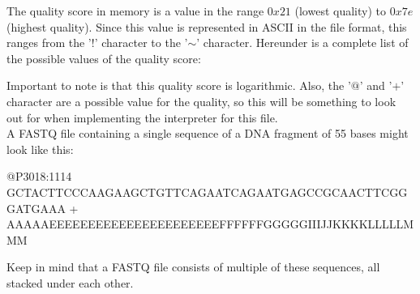 The quality score in memory is a value in the range $0x21$ (lowest quality) to $0x7e$ (highest quality). Since this value is represented in ASCII in the file format, this ranges from the '$!$' character to the '$\mathtt{\sim}$' character. Hereunder is a complete list of the possible values of the quality score:

\begin{lcverbatim}
!"#$%
[\]^_`abcdefghijklmnopqrstuvwxyz{|}~
\end{lcverbatim}


Important to note is that this quality score is logarithmic. Also, the '$@$' and '$+$' character are a possible value for the quality, so this will be something to look out for when implementing the interpreter for this file.\\

	
A FASTQ file containing a single sequence of a DNA fragment of 55 bases might look like this:


\begin{lcverbatim}
@P3018:1114
GCTACTTCCCAAGAAGCTGTTCAGAATCAGAATGAGCCGCAACTTCGGGATGAAA
+
AAAAAEEEEEEEEEEEEEEEEEEEEEEFFFFFFGGGGGIIIJJKKKKLLLLLMMM
\end{lcverbatim}

Keep in mind that a FASTQ file consists of multiple of these sequences, all stacked under each other.
	
	

